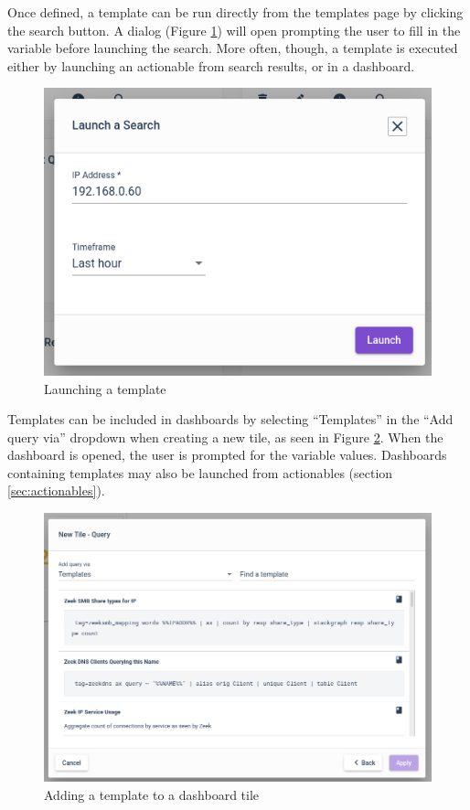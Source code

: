 Once defined, a template can be run directly from the templates page by clicking the search button. A dialog (Figure \ref{fig:template-prompt}) will open prompting the user to fill in the variable before launching the search. More often, though, a template is executed either by launching an actionable from search results, or in a dashboard.

\begin{figure}
	\includegraphics[width=0.6\linewidth]{images/template-prompt.png}
	\caption{Launching a template}
	\label{fig:template-prompt}
\end{figure}

Templates can be included in dashboards by selecting ``Templates'' in the ``Add query via'' dropdown when creating a new tile, as seen in Figure \ref{fig:dashboard-template}. When the dashboard is opened, the user is prompted for the variable values. Dashboards containing templates may also be launched from actionables (section \ref{sec:actionables}).

\begin{figure}
	\includegraphics[width=0.8\linewidth]{images/dashboard-template.png}
	\caption{Adding a template to a dashboard tile}
	\label{fig:dashboard-template}
\end{figure}


